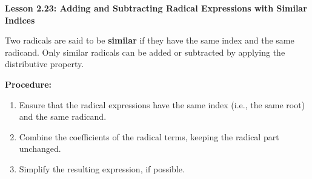 \begin{center}
\textbf{Lesson 2.23: Adding and Subtracting Radical Expressions with Similar Indices}
\end{center}

\vspace*{1ex}

Two radicals are said to be \textbf{similar} if they have the same index and the same radicand. Only similar radicals can be added or subtracted by applying the distributive property.

\noindent\textbf{Procedure:}
\begin{enumerate}
    \item Ensure that the radical expressions have the same index (i.e., the same root) and the same radicand.
    \item Combine the coefficients of the radical terms, keeping the radical part unchanged.
    \item Simplify the resulting expression, if possible.
\end{enumerate}


